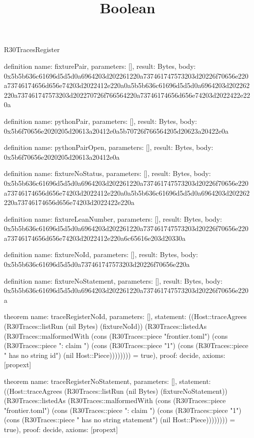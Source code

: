 \begin{lexlean}{R30TracesRegister}
\title{Boolean}
\begin{semanticmodule}
definition{
  name: fixturePair,
  parameters: [],
  result: Bytes,
  body: 0x5b5b636c61696d5d5d0a6964203d202261220a737461747573203d20226f70656e220a73746174656d656e74203d2022412e220a0a5b5b636c61696d5d5d0a6964203d202262220a737461747573203d202270726f766564220a73746174656d656e74203d2022422e220a
}

definition{
  name: pythonPair,
  parameters: [],
  result: Bytes,
  body: 0x5b6f70656e2020205d20613a20412e0a5b70726f766564205d20623a20422e0a
}

definition{
  name: pythonPairOpen,
  parameters: [],
  result: Bytes,
  body: 0x5b6f70656e2020205d20613a20412e0a
}

definition{
  name: fixtureNoStatus,
  parameters: [],
  result: Bytes,
  body: 0x5b5b636c61696d5d5d0a6964203d202261220a737461747573203d20226f70656e220a73746174656d656e74203d2022412e220a0a5b5b636c61696d5d5d0a6964203d202262220a73746174656d656e74203d2022422e220a
}

definition{
  name: fixtureLeanNumber,
  parameters: [],
  result: Bytes,
  body: 0x5b5b636c61696d5d5d0a6964203d202261220a737461747573203d20226f70656e220a73746174656d656e74203d2022412e220a6c65616e203d20330a
}

definition{
  name: fixtureNoId,
  parameters: [],
  result: Bytes,
  body: 0x5b5b636c61696d5d5d0a737461747573203d20226f70656e220a
}

definition{
  name: fixtureNoStatement,
  parameters: [],
  result: Bytes,
  body: 0x5b5b636c61696d5d5d0a6964203d202261220a737461747573203d20226f70656e220a
}

theorem{
  name: traceRegisterNoId,
  parameters: [],
  statement: ((Host::traceAgrees (R30Traces::listRun (nil Bytes) (fixtureNoId)) (R30Traces::listedAs (R30Traces::malformedWith (cons (R30Traces::piece "frontier.toml") (cons (R30Traces::piece ": claim ") (cons (R30Traces::piece "1") (cons (R30Traces::piece " has no string id") (nil Host::Piece)))))))) = true),
  proof: decide{},
  axioms: [propext]
}

theorem{
  name: traceRegisterNoStatement,
  parameters: [],
  statement: ((Host::traceAgrees (R30Traces::listRun (nil Bytes) (fixtureNoStatement)) (R30Traces::listedAs (R30Traces::malformedWith (cons (R30Traces::piece "frontier.toml") (cons (R30Traces::piece ": claim ") (cons (R30Traces::piece "1") (cons (R30Traces::piece " has no string statement") (nil Host::Piece)))))))) = true),
  proof: decide{},
  axioms: [propext]
}


\end{semanticmodule}
\end{lexlean}
